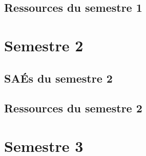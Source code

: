 \documentclass[10pt,french]{article} %
\begin{document}
\subsection{Ressources du semestre 1}


%
%
%
%
%
\newpage


\section{Semestre 2}
\def\sem{B} %
%
\subsection{SAÉs du semestre 2}


\subsection{Ressources du semestre 2}


%
%
%
%
%
\newpage


\section{Semestre 3}
\def\sem{C} %
\end{document}
